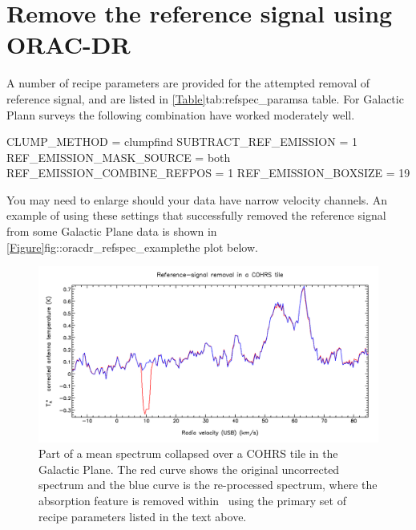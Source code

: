 \documentclass[11pt,oneside,chapters]{starlink}
\begin{document}
\section{Remove the reference signal using ORAC-DR}

A number of recipe parameters are provided for the attempted removal
of reference signal, and are listed in
\cref{Table}{tab:refspec_params}{a table}.
For Galactic Plann surveys the following combination have worked
moderately well.

\begin{terminalv}
CLUMP_METHOD = clumpfind
SUBTRACT_REF_EMISSION = 1
REF_EMISSION_MASK_SOURCE = both
REF_EMISSION_COMBINE_REFPOS = 1
REF_EMISSION_BOXSIZE = 19
\end{terminalv}

You may need to enlarge  should your data
have narrow velocity channels.  An example of using these settings
that successfully removed the reference signal from some Galactic Plane
data is shown in \cref{Figure}{fig::oracdr_refspec_example}{the plot below}.

\begin{figure}[h!]
\begin{center}
\includegraphics[width=1.0\linewidth]{sc20_refspec_oracdr}
\caption[Examples of reference-signal removal in \oracdr]{\label{fig::oracdr_refspec_example}
  Part of a mean spectrum collapsed over a COHRS\cite{COHRS} tile in the
  Galactic Plane.  The red curve shows the original uncorrected spectrum
  and the blue curve is the re-processed spectrum, where the absorption
  feature is removed within \oracdr\ using the primary set of recipe
  parameters listed in the text above.}
\end{center}
\end{figure}
\end{document}
